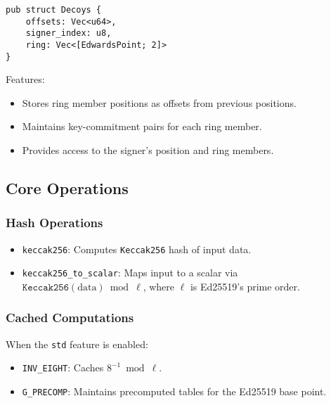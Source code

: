 \documentclass[12pt,a4paper]{article}
\begin{document}
\begin{verbatim}
pub struct Decoys {
    offsets: Vec<u64>,
    signer_index: u8,
    ring: Vec<[EdwardsPoint; 2]>
}
\end{verbatim}

Features:
\begin{itemize}
  \item Stores ring member positions as offsets from previous positions.  %
  \item Maintains key-commitment pairs for each ring member.  %
  \item Provides access to the signer's position and ring members. %
\end{itemize}

\subsection{Core Operations}

\subsubsection{Hash Operations}
\begin{itemize}
  \item \texttt{keccak256}: Computes \texttt{Keccak256} hash of input data.  %
  \item \texttt{keccak256\_to\_scalar}: Maps input to a scalar via $\texttt{Keccak256}(\text{data}) \bmod \ell$, where $\ell$ is Ed25519's prime order. %
\end{itemize}

\subsubsection{Cached Computations}
When the \texttt{std} feature is enabled:
\begin{itemize}
  \item \texttt{INV\_EIGHT}: Caches $8^{-1} \bmod \ell$.  %
  \item \texttt{G\_PRECOMP}: Maintains precomputed tables for the Ed25519 base point. %
\end{itemize}
\end{document}
